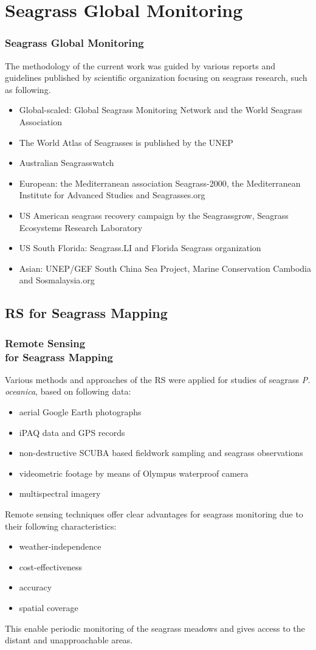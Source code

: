 \documentclass[pdflatex,compress,9pt,
	xcolor={dvipsnames,dvipsnames,svgnames,x11names,table},
	hyperref={colorlinks = true,breaklinks = true, urlcolor = NavyBlue, breaklinks = true}]{beamer}
\begin{document}
\section{Seagrass Global Monitoring}
\begin{frame}\frametitle{Seagrass Global Monitoring}
The methodology of the current work was guided by various reports and guidelines published by scientific organization focusing on seagrass research, such as following.
\begin{itemize}
	\item Global-scaled: Global Seagrass Monitoring Network and the World Seagrass Association
	\item The World Atlas of Seagrasses is published by the \ac{UNEP}
	\item Australian Seagrasswatch
	\item European: the Mediterranean association Seagrass-2000, the Mediterranean Institute for Advanced Studies and Seagrasses.org
	\item US American seagrass recovery campaign by the Seagrassgrow, Seagrass Ecosystems Research Laboratory
	\item US South Florida: Seagrass.LI and Florida Seagrass organization
	\item Asian: \ac{UNEP}/\ac{GEF} South China Sea Project, Marine Conservation Cambodia and Sosmalaysia.org
\end{itemize}
\end{frame}

\subsection{RS for Seagrass Mapping}
\begin{frame}\frametitle{Remote Sensing \\for Seagrass Mapping}
Various methods and approaches of the \ac{RS} were applied for studies of seagrass \emph{P. oceanica}, based on following data:
\begin{itemize}
	\item aerial Google Earth photographs
	\item iPAQ data and \ac{GPS} records
	\item non-destructive \ac{SCUBA} based fieldwork sampling and seagrass observations
	\item videometric footage by means of Olympus waterproof camera
	\item multispectral imagery
\end{itemize}

Remote sensing techniques offer clear advantages for seagrass monitoring due to their following characteristics:
\begin{itemize}
	\item weather-independence
	\item cost-effectiveness
	\item accuracy
	\item spatial coverage
\end{itemize}
This enable periodic monitoring of the seagrass meadows and gives access to the distant and unapproachable areas.
\end{frame}
\end{document}
